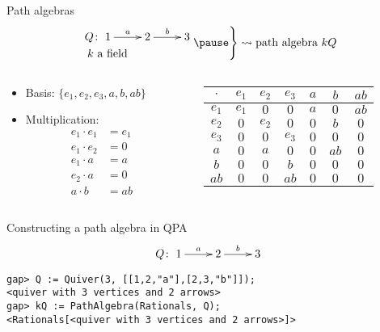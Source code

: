 \begin{frame}{Path algebras}{}
\[
\left.
\begin{aligned}
Q &\colon \xymatrix{1\ar[r]^a & 2\ar[r]^b & 3} \\
k &\ \text{a field}
\end{aligned}
\pause
\right\}
\rightsquigarrow
\text{path algebra $kQ$}
\]
\begin{columns}
\begin{column}{0.5\textwidth}
\begin{itemize}
\pause
\item Basis: $\{ e_1, e_2, e_3, a, b, ab \}$\\
\pause
\item Multiplication:
\begin{align*}
e_1 \cdot e_1 &= e_1 \\
e_1 \cdot e_2 &= 0 \\
e_1 \cdot a &= a \\
e_2 \cdot a &= 0 \\
a \cdot b &= ab &
\end{align*}
\pause
\end{itemize}
\end{column}
\begin{column}{0.5\textwidth}
\begin{tabular}{c|cccccc}
$\cdot$ & $e_1$ & $e_2$ & $e_3$ & $a$   & $b$   & $ab$ \\
\hline
$e_1$   & $e_1$ & $0$   & $0$   & $a$   & $0$   & $ab$ \\
$e_2$   & $0$   & $e_2$ & $0$   & $0$   & $b$   & $0$  \\
$e_3$   & $0$   & $0$   & $e_3$ & $0$   & $0$   & $0$  \\
$a$     & $0$   & $a$   & $0$   & $0$   & $ab$  & $0$  \\
$b$     & $0$   & $0$   & $b$   & $0$   & $0$   & $0$  \\
$ab$    & $0$   & $0$   & $ab$  & $0$   & $0$   & $0$
\end{tabular}
\end{column}
\end{columns}
\end{frame}

\begin{frame}[fragile]{Constructing a path algebra in QPA}{}
{\Large
\[
Q \colon \xymatrix{1\ar[r]^a & 2\ar[r]^b & 3}
\]
}
\begin{verbatim}
gap> Q := Quiver(3, [[1,2,"a"],[2,3,"b"]]); 
<quiver with 3 vertices and 2 arrows>
gap> kQ := PathAlgebra(Rationals, Q);
<Rationals[<quiver with 3 vertices and 2 arrows>]>
\end{verbatim}



\end{frame}

